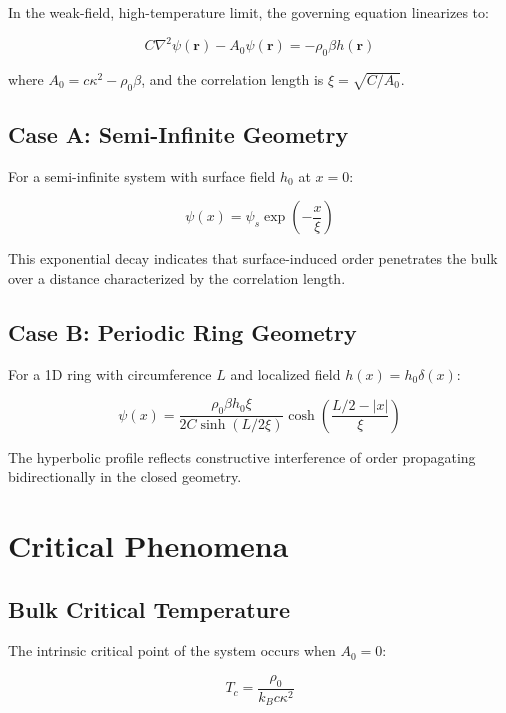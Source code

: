 \documentclass[12pt,a4paper]{article}
\begin{document}
In the weak-field, high-temperature limit, the governing equation linearizes to:

\begin{equation}
    C \nabla^2 \psi(\mathbf{r}) - A_0 \psi(\mathbf{r}) = -\rho_0 \beta h(\mathbf{r})
\end{equation}

where $A_0 = c\kappa^2 - \rho_0\beta$, and the correlation length is $\xi = \sqrt{C/A_0}$.

\subsection{Case A: Semi-Infinite Geometry}

For a semi-infinite system with surface field $h_0$ at $x=0$:

\begin{equation}
    \psi(x) = \psi_s \exp\left( -\frac{x}{\xi} \right)
\end{equation}

This exponential decay indicates that surface-induced order penetrates the bulk over a distance characterized by the correlation length.

\subsection{Case B: Periodic Ring Geometry}

For a 1D ring with circumference $L$ and localized field $h(x) = h_0\delta(x)$:

\begin{equation}
    \psi(x) = \frac{\rho_0 \beta h_0 \xi}{2C \sinh(L/2\xi)} \cosh\left( \frac{L/2 - |x|}{\xi} \right)
\end{equation}

The hyperbolic profile reflects constructive interference of order propagating bidirectionally in the closed geometry.

\section{Critical Phenomena}

\subsection{Bulk Critical Temperature}

The intrinsic critical point of the system occurs when $A_0 = 0$:

\begin{equation}
    T_c = \frac{\rho_0}{k_B c \kappa^2}
\end{equation}
\end{document}
